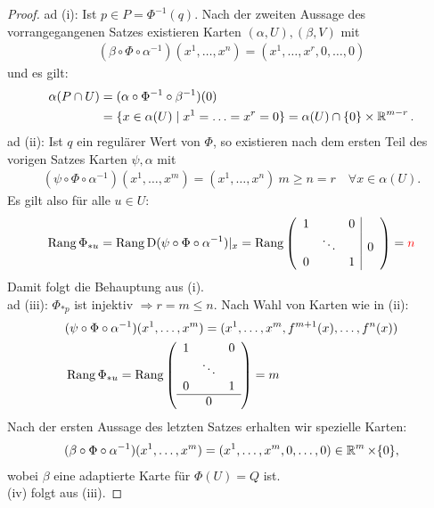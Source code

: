 \begin{proof}
  ad (i): Ist $p \in P = \Phi^{-1}(q)$. Nach der zweiten Aussage des vorrangegangenen Satzes existieren Karten $(\alpha,U), (\beta, V)$ mit 
  \begin{align*}
    (\beta \circ \Phi \circ \alpha^{-1})(x^1,\ldots,x^n) = (x^1, \ldots,x^r, 0, \ldots, 0)
  \end{align*}
  und es gilt:
  \begin{align*}
    \alpha(P \cap U) & = (\alpha \circ \Phi^{-1} \circ \beta^{-1})(0) \\
    & = \{x \in \alpha (U) \mid x^1 = \ldots = x^r = 0\} = \alpha(U) \cap \{0\} \times \operatorname{\mathbb{R}}^{m-r}.
  \end{align*} 
  ad (ii): Ist $q$ ein regulärer Wert von $\Phi$, so existieren nach dem ersten Teil des vorigen Satzes Karten $\psi,\alpha$ mit 
  \begin{align*}
    (\psi \circ \Phi \circ \alpha^{-1})(x^1, \ldots, x^m) = (x^1, \ldots, x^n) \ m \geq n = r \quad \forall x \in \alpha(U).
  \end{align*}
  Es gilt also für alle $u \in U$:
  \begin{align*}
    \operatorname{Rang} \Phi_{*u} = \operatorname{Rang} \operatorname{D}(\psi \circ \Phi \circ \alpha^{-1})|_x = \operatorname{Rang}
    \left(\begin{array}{ccc|c}
      1 &  & 0 & \\
      & \ddots & & 0 \\
      0 & & 1 & 
    \end{array}\right)
    = \textcolor{red}{n}
  \end{align*}
  Damit folgt die Behauptung aus (i).\\
  ad (iii): $\Phi_{*p}$ ist injektiv $\Rightarrow r = m \leq n$. Nach Wahl von Karten wie in (ii):
  \begin{align*}
    & (\psi \circ \Phi \circ \alpha^{-1})(x^1, \ldots, x^m) = (x^1, \ldots, x^m,f^{m+1}(x), \ldots, f^n(x))\\
    & \Rang \Phi_{*u} = \Rang 
    \left( \begin{array}{ccc}
      1 & & 0 \\
        & \ddots &  \\
      0 & & 1 \\
      \hline
        & 0      & 
      \end{array} \right)
    = m %
  \end{align*}
  Nach der ersten Aussage des letzten Satzes erhalten wir spezielle Karten:
  \begin{align*}
    (\beta \circ \Phi \circ \alpha^{-1})(x^1, \ldots, x^m) = (x^1, \ldots, x^m, 0, \ldots, 0) \in \operatorname{\mathbb{R}}^{m} \times \{0\},
  \end{align*}
  wobei $\beta$ eine adaptierte Karte für $\Phi(U) = Q$ ist.\\
  (iv) folgt aus (iii).
\end{proof}

